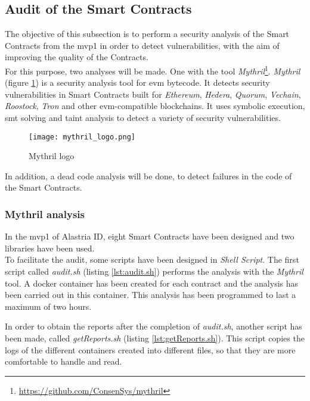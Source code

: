 \subsection{Audit of the Smart Contracts}
The objective of this subsection is to perform a security analysis of the Smart Contracts from the  \acrshort{mvp}1 in order to detect vulnerabilities, with the aim of improving the quality of the Contracts.\\

For this purpose, two analyses will be made. One with the tool \textit{Mythril}\footnote{\url{https://github.com/ConsenSys/mythril}}. \textit{Mythril} (figure \ref{fig:myth}) is a security analysis tool for \acrshort{evm} bytecode. It detects security vulnerabilities in Smart Contracts built for \textit{Ethereum}, \textit{Hedera}, \textit{Quorum}, \textit{Vechain}, \textit{Roostock}, \textit{Tron} and other \acrshort{evm}-compatible blockchains. It uses symbolic execution, \acrshort{smt} solving and taint analysis to detect a variety of security vulnerabilities.
\begin{figure}[h]
    \centering
    \texttt{[image: mythril\_logo.png]}
    \caption{Mythril logo}
    \label{fig:myth}
\end{figure}

In addition, a dead code analysis will be done, to detect failures in the code of the Smart Contracts.

\subsubsection{Mythril analysis}
In the \acrshort{mvp}1 of Alastria ID, eight Smart Contracts have been designed and two libraries have been used.\\

To facilitate the audit, some scripts have been designed in \textit{Shell Script}. The first script called \textit{audit.sh} (listing \ref{lst:audit.sh}) performs the analysis with the \textit{Mythril} tool. A docker container has been created for each contract and the analysis has been carried out in this container. This analysis has been programmed to last a maximum of two hours.



In order to obtain the reports after the completion of \textit{audit.sh}, another script has been made, called \textit{getReports.sh} (listing \ref{lst:getReports.sh}). This script copies the logs of the different containers created into different files, so that they are more comfortable to handle and read.\\

